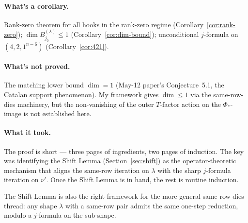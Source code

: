 \documentclass[11pt]{article}
\theoremstyle{definition}
\begin{document}
\paragraph{What's a corollary.}  Rank-zero theorem for all hooks in the
rank-zero regime (Corollary~\ref{cor:rank-zero}); $\dim
B^{(\lambda)}_{j_0} \le 1$ (Corollary~\ref{cor:dim-bound});
unconditional $j$-formula on $(4, 2, 1^{n-6})$
(Corollary~\ref{cor:421}).

\paragraph{What's not proved.}  The matching lower bound $\dim = 1$
(May-12 paper's Conjecture~5.1, the Catalan support phenomenon).  My
framework gives $\dim \le 1$ via the same-row-dies machinery, but the
non-vanishing of the outer $T$-factor action on the $\Phi_*$-image is
not established here.

\paragraph{What it took.}  The proof is short --- three pages of
ingredients, two pages of induction.  The key was identifying the
Shift Lemma (Section~\ref{sec:shift}) as the operator-theoretic
mechanism that aligns the same-row iteration on $\lambda$ with the
sharp $j$-formula iteration on $\nu'$.  Once the Shift Lemma is in
hand, the rest is routine induction.

The Shift Lemma is also the right framework for the more general
same-row-dies thread: any shape $\lambda$ with a same-row pair admits
the same one-step reduction, modulo a $j$-formula on the sub-shape.
\end{document}
